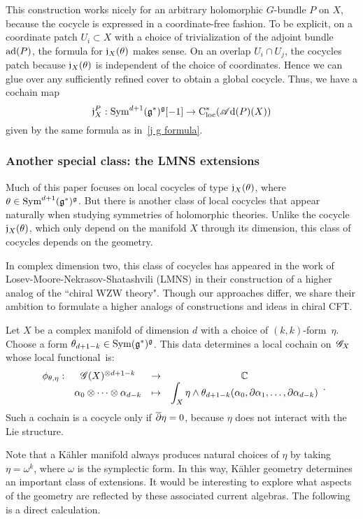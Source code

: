 This construction works nicely for an arbitrary holomorphic $G$-bundle $P$ on $X$,
because the cocycle is expressed in a coordinate-free fashion.
To be explicit, on a coordinate patch $U_i \subset X$ with a choice of trivialization of the adjoint bundle ${\rm ad}(P)$,
the formula for $\mathfrak j_X(\theta)$ makes sense.
On an overlap $U_i \cap U_j$, the cocycles patch because $\mathfrak j_X(\theta)$ is independent of the choice of coordinates.
Hence we can glue over any sufficiently refined cover to obtain a global cocycle. 
Thus, we have a cochain map
\[
\mathfrak j_X^P : {\rm Sym}^{d+1} (\mathfrak g^*)^\mathfrak g [-1] \to {\rm C}_{\rm loc}^*(\mathscr A{\rm d}(P)(X))
\]
given by the same formula as in~\eqref{j g formula}.

\subsubsection{Another special class: the LMNS extensions}
\label{sec: nekext}

Much of this paper focuses on local cocycles of type $\mathfrak j_X(\theta)$, where $\theta \in {\rm Sym}^{d+1}(\mathfrak g^*)^\mathfrak g$.
But there is another class of local cocycles that appear naturally when studying symmetries of holomorphic theories. 
Unlike the cocycle $\mathfrak j_X(\theta)$, which only depend on the manifold $X$ through its dimension, 
this class of cocycles depends on the geometry.

In complex dimension two, this class of cocycles has appeared in the work of Losev-Moore-Nekrasov-Shatashvili (LMNS) \cite{LMNS1,LMNS2,LMNS3} in their construction of a higher analog of the ``chiral WZW theory". 
Though our approaches differ, we share their ambition to formulate a higher analogs of constructions and ideas in chiral CFT. 

Let $X$ be a complex manifold of dimension $d$ with a choice of $(k,k)$-form~$\eta$. 
Choose a form $\theta_{d+1-k} \in {\rm Sym}(\mathfrak g^*)^\mathfrak g$.
This data determines a local cochain on~$\mathscr G_X$ whose local functional~is:
\[
\begin{array}{cccc}
\displaystyle \phi_{\theta, \eta} : & \mathscr G(X)^{\otimes d + 1 - k} & \to & \mathbb C \\
\displaystyle & \alpha_0 \otimes\cdots \otimes \alpha_{d-k} & \mapsto & \displaystyle \int_X \eta \wedge \theta_{d+1-k}(\alpha_0, \partial\alpha_1,\ldots,\partial \alpha_{d-k})
\end{array}.
\]
Such a cochain is a cocycle only if $\overline{\partial} \eta = 0$, because $\eta$ does not interact with the Lie structure.

Note that a K\"{a}hler manifold always produces natural choices of $\eta$ by taking $\eta = \omega^{k}$, where $\omega$ is the symplectic form.
In this way, K\"{a}hler geometry determines an important class of extensions.
It would be interesting to explore what aspects of the geometry are reflected by these associated current algebras.
The following is a direct calculation.

